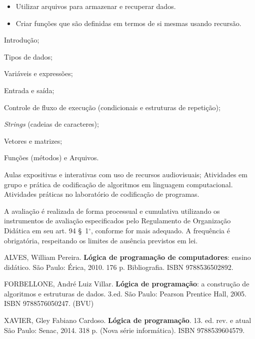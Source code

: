 \begin{pud}
\begin{itemize}
		\item Utilizar arquivos para armazenar e recuperar dados.

		\item Criar funções que são definidas em termos de si mesmas usando recursão.
	\end{itemize}
	
	
	
	\programa	
	\begin{description}[itemsep=0em]
	   \item[UNIDADE I:] Introdução;
	    \item[UNIDADE II:] Tipos de dados;
	    \item[UNIDADE III:]  Variáveis e expressões;
	    \item[UNIDADE IV:]  Entrada e saída;
	    \item[UNIDADE V:]  Controle de fluxo de execução (condicionais e estruturas de repetição);
	    \item[UNIDADE VI:]  \textit{Strings} (cadeias de caracteres);
	    \item[UNIDADE VII:]  Vetores e matrizes;
	   \item[UNIDADE VIII:] Funções (métodos) e Arquivos.
	\end{description}
		
	\metodologia            	
       Aulas expositivas e interativas com uso de recursos audiovisuais;
       Atividades em grupo e prática de codificação de algoritmos em linguagem computacional.
       Atividades práticas no laboratório de codificação de programas.
	
	
	\avaliacao	
	A avaliação é realizada de forma processual e cumulativa utilizando os instrumentos de avaliação especificados pelo Regulamento de Organização Didática em seu art. 94 \S~1$^\circ$, conforme for mais adequado. A frequência é obrigatória, respeitando os limites de ausência previstos em lei.
	
	\begin{bibbasica}
		\item ALVES, William Pereira. \textbf{Lógica de programação de computadores}: ensino didático. São Paulo: Érica, 2010. 176 p. Bibliografia. ISBN 9788536502892. 
		\item FORBELLONE, André Luiz Villar. \textbf{Lógica de programação}: a construção de algoritmos e estruturas de dados. 3.ed. São Paulo: Pearson Prentice Hall, 2005.  ISBN 9788576050247. (BVU)
	 	\item XAVIER, Gley Fabiano Cardoso. \textbf{Lógica de programação}. 13. ed. rev. e atual São Paulo: Senac, 2014. 318 p. (Nova série informática). ISBN 9788539604579.
	 	 

\end{bibbasica}
\end{pud}
